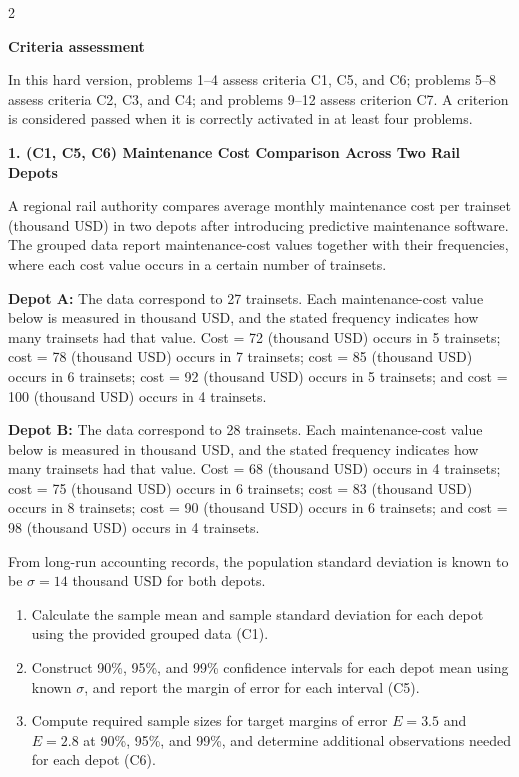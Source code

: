 \documentclass[12pt]{article}
\newcommand{\SubsectionBox}[1]{%
	\noindent\colorbox{gray!30}{%
		\parbox{\linewidth}{\textbf{#1}}%
	}\par\vspace{0.35cm}%
}
\begin{document}
	\vspace{0.4cm}
	
	\begin{multicols}{2}
		\SubsectionBox{Criteria assessment}\vspace{-0.25cm}
		In this hard version, problems 1--4 assess criteria C1, C5, and C6; problems 5--8 assess criteria C2, C3, and C4; and problems 9--12 assess criterion C7. A criterion is considered passed when it is correctly activated in at least four problems.
		
		\vspace{0.25cm}
		\SubsectionBox{1. (C1, C5, C6) Maintenance Cost Comparison Across Two Rail Depots}\vspace{-0.25cm}
		A regional rail authority compares average monthly maintenance cost per trainset (thousand USD) in two depots after introducing predictive maintenance software.
		The grouped data report maintenance-cost values together with their frequencies, where each cost value occurs in a certain number of trainsets.
		
		\textbf{Depot A:} The data correspond to 27 trainsets. Each maintenance-cost value below is measured in thousand USD, and the stated frequency indicates how many trainsets had that value. Cost = 72 (thousand USD) occurs in 5 trainsets; cost = 78 (thousand USD) occurs in 7 trainsets; cost = 85 (thousand USD) occurs in 6 trainsets; cost = 92 (thousand USD) occurs in 5 trainsets; and cost = 100 (thousand USD) occurs in 4 trainsets.
		
		\textbf{Depot B:} The data correspond to 28 trainsets. Each maintenance-cost value below is measured in thousand USD, and the stated frequency indicates how many trainsets had that value. Cost = 68 (thousand USD) occurs in 4 trainsets; cost = 75 (thousand USD) occurs in 6 trainsets; cost = 83 (thousand USD) occurs in 8 trainsets; cost = 90 (thousand USD) occurs in 6 trainsets; and cost = 98 (thousand USD) occurs in 4 trainsets.
		
		From long-run accounting records, the population standard deviation is known to be $\sigma = 14$ thousand USD for both depots.
		\begin{enumerate}
			\item Calculate the sample mean and sample standard deviation for each depot using the provided grouped data (C1).
			\item Construct 90\%, 95\%, and 99\% confidence intervals for each depot mean using known $\sigma$, and report the margin of error for each interval (C5).
			\item Compute required sample sizes for target margins of error $E=3.5$ and $E=2.8$ at 90\%, 95\%, and 99\%, and determine additional observations needed for each depot (C6).
		\end{enumerate}
		

\end{multicols}
\end{document}
